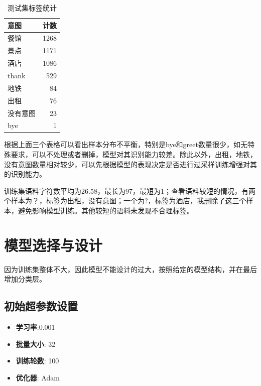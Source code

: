 \documentclass{article}
\begin{document}
\begin{table}[h!]
\begin{minipage}[b]{0.3\textwidth}
	\end{minipage}
	\hspace{0.05\textwidth} %
	\begin{minipage}[b]{0.25\textwidth}
    	\centering
		\caption{测试集标签统计}
	    \begin{tabular}{|l|r|}
			\hline
			\textbf{意图} & \textbf{计数} \\
			\hline
			餐馆 & 1268 \\
			景点 & 1171 \\
			酒店 & 1086 \\
			thank & 529 \\
			地铁 & 84 \\
			出租 & 76 \\
			没有意图 & 23 \\
			bye & 1 \\
			\hline
		\end{tabular}
	\end{minipage}
	
\end{table}

	根据上面三个表格可以看出样本分布不平衡，特别是bye和greet数量很少，如无特殊要求，可以不处理或者删掉，模型对其识别能力较差。除此以外，出租，地铁，没有意图数量相对较少，可以先根据模型的表现决定是否进行过采样训练增强对其的识别能力。

	训练集语料字符数平均为26.58，最长为97，最短为1；查看语料较短的情况，有两个样本为？，标签为出租，没有意图；一个为?，标签为酒店，我删除了这三个样本，避免影响模型训练。其他较短的语料未发现不合理标签。
	
	\section{模型选择与设计}
	
	因为训练集整体不大，因此模型不能设计的过大，按照给定的模型结构，并在最后增加分类层。
		
	\subsection{初始超参数设置}
	\begin{itemize}
		\item \textbf{学习率}:0.001
		\item \textbf{批量大小}: 32
		\item \textbf{训练轮数}: 100
		\item \textbf{优化器}: Adam
	\end{itemize}
	
\end{document}

